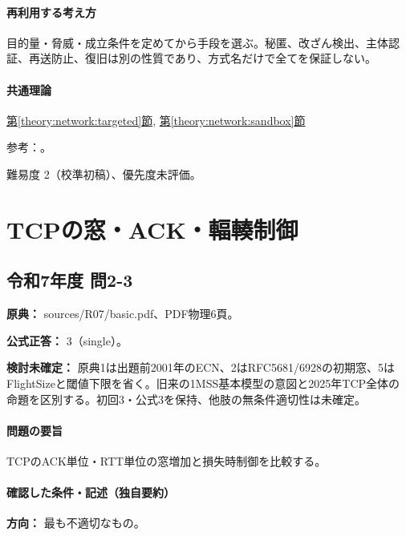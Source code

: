 \paragraph{再利用する考え方} 目的量・脅威・成立条件を定めてから手段を選ぶ。秘匿、改ざん検出、主体認証、再送防止、復旧は別の性質であり、方式名だけで全てを保証しない。

\paragraph{共通理論} \hyperref[theory:network:targeted]{第\ref*{theory:network:targeted}節}, \hyperref[theory:network:sandbox]{第\ref*{theory:network:sandbox}節}

\par 参考：\cite{net_target2020,net_target2023}。

\par 難易度 2（校準初稿）、優先度未評価。

\section{TCPの窓・ACK・輻輳制御}

\subsection{令和7年度 問2-3}
\label{q:r07-reg-basic-2-3}

\noindent\textbf{原典：} sources/R07/basic.pdf、PDF物理6頁。

\textbf{公式正答：} 3（single）。

\par\textbf{検討未確定：} 原典1は出題前2001年のECN、2はRFC5681/6928の初期窓、5はFlightSizeと閾値下限を省く。旧来の1MSS基本模型の意図と2025年TCP全体の命題を区別する。初回3・公式3を保持、他肢の無条件適切性は未確定。

\paragraph{問題の要旨} TCPのACK単位・RTT単位の窓増加と損失時制御を比較する。

\paragraph{確認した条件・記述（独自要約）}\mbox{}\par

\noindent\textbf{方向：} 最も不適切なもの。\par

